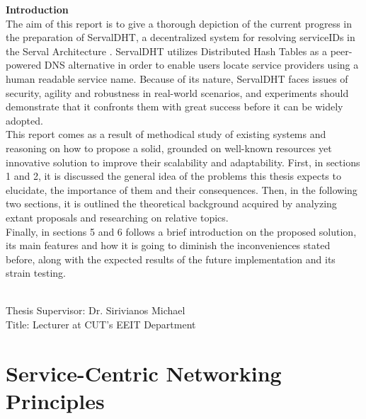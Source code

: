 \documentclass[12pt,a4paper,oneside]{article}
\begin{document}
{\Large \bf \noindent Introduction} \\[0.5cm]
The aim of this report is to give a thorough depiction of the current progress in the preparation of ServalDHT, a decentralized system for resolving serviceIDs in the Serval Architecture \cite{Nordstrom2012}.
ServalDHT utilizes Distributed Hash Tables  as a peer-powered DNS   alternative in order to enable users locate service providers using a human readable service name.
Because of its nature, ServalDHT faces issues of security, agility and robustness in real-world scenarios, and experiments should demonstrate that it confronts them with great success before it can be widely adopted.\\
\indent This report comes as a result of methodical study of existing systems and reasoning on how to propose a solid, grounded on well-known resources yet innovative solution to improve their scalability and adaptability.
First, in sections 1 and 2, it is discussed the general idea of the problems this thesis expects to elucidate, the importance of them and their consequences.
Then, in the following two sections, it is outlined the theoretical background acquired by analyzing extant proposals and researching on relative topics.\\
\indent Finally, in sections 5 and 6 follows a brief introduction on the proposed solution, its main features and how it is going to diminish the inconveniences stated before, along with the expected results of the future implementation and its strain testing.

~\\[0.5cm]
{\large
\noindent Thesis Supervisor: Dr. Sirivianos Michael\\
\noindent Title: Lecturer at CUT's EEIT Department}







\newpage
\section{Service-Centric Networking Principles}

\end{document}

